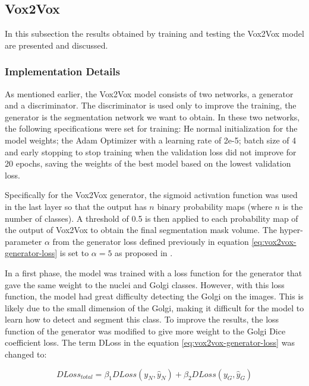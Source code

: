 \subsection{Vox2Vox}

In this subsection the results obtained by training and testing the Vox2Vox model are presented and discussed.

\subsubsection*{Implementation Details}

As mentioned earlier, the Vox2Vox model consists of two networks, a generator and a discriminator. The discriminator is used only to improve the training, the generator is the segmentation network we want to obtain. In these two networks, the following specifications were set for training: He normal initialization for the model weights; the Adam Optimizer with a learning rate of 2e-5; batch size of 4 and early stopping to stop training when the validation loss did not improve for 20 epochs, saving the weights of the best model based on the lowest validation loss.

Specifically for the Vox2Vox generator, the sigmoid activation function was used in the last layer so that the output has $n$ binary probability maps (where $n$ is the number of classes). A threshold of 0.5 is then applied to each probability map of the output of Vox2Vox to obtain the final segmentation mask volume. The hyper-parameter $\alpha$ from the generator loss defined previously in equation \ref{eq:vox2vox-generator-loss} is set to $\alpha = 5$ as proposed in \cite{vox2vox}.

In a first phase, the model was trained with a loss function for the generator that gave the same weight to the nuclei and Golgi classes. However, with this loss function, the model had great difficulty detecting the Golgi on the images. This is likely due to the small dimension of the Golgi, making it difficult for the model to learn how to detect and segment this class. To improve the results, the loss function of the generator was modified to give more weight to the Golgi Dice coefficient loss. The term \ac{DLoss} in the equation \ref{eq:vox2vox-generator-loss} was changed to:

\begin{equation}
    DLoss_{total} = \beta_1 DLoss(y_N,\hat{y}_N) + \beta_2 DLoss(y_G,\hat{y}_G)
\end{equation}

